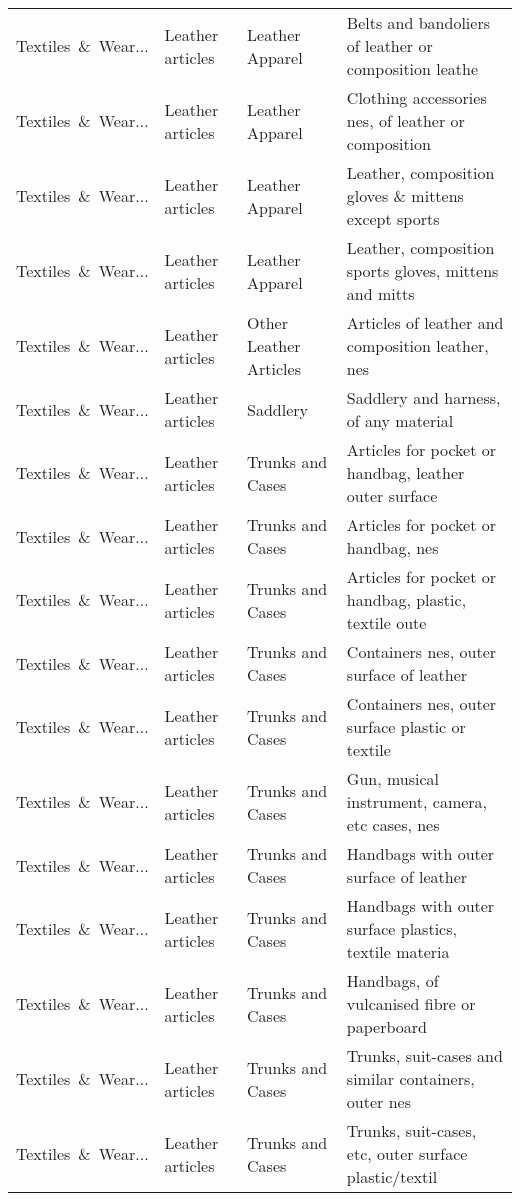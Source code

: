 \begin{appendices}
\begin{xltabular}{\textwidth}{|p{0.10\textwidth}|p{0.25\textwidth}|p{0.24\textwidth}|p{0.31\textwidth}|}
Textiles\ \&\ Wear... & Leather articles & Leather Apparel & Belts and bandoliers of leather or composition leathe \\
Textiles\ \&\ Wear... & Leather articles & Leather Apparel & Clothing accessories nes, of leather or composition \\
Textiles\ \&\ Wear... & Leather articles & Leather Apparel & Leather, composition gloves \& mittens except sports \\
Textiles\ \&\ Wear... & Leather articles & Leather Apparel & Leather, composition sports gloves, mittens and mitts \\
Textiles\ \&\ Wear... & Leather articles & Other Leather Articles & Articles of leather and composition leather, nes \\
Textiles\ \&\ Wear... & Leather articles & Saddlery & Saddlery and harness, of any material \\
Textiles\ \&\ Wear... & Leather articles & Trunks and Cases & Articles for pocket or handbag, leather outer surface \\
Textiles\ \&\ Wear... & Leather articles & Trunks and Cases & Articles for pocket or handbag, nes \\
Textiles\ \&\ Wear... & Leather articles & Trunks and Cases & Articles for pocket or handbag, plastic, textile oute \\
Textiles\ \&\ Wear... & Leather articles & Trunks and Cases & Containers nes, outer surface of leather \\
Textiles\ \&\ Wear... & Leather articles & Trunks and Cases & Containers nes, outer surface plastic or textile \\
Textiles\ \&\ Wear... & Leather articles & Trunks and Cases & Gun, musical instrument, camera, etc cases, nes \\
Textiles\ \&\ Wear... & Leather articles & Trunks and Cases & Handbags with outer surface of leather \\
Textiles\ \&\ Wear... & Leather articles & Trunks and Cases & Handbags with outer surface plastics, textile materia \\
Textiles\ \&\ Wear... & Leather articles & Trunks and Cases & Handbags, of vulcanised fibre or paperboard \\
Textiles\ \&\ Wear... & Leather articles & Trunks and Cases & Trunks, suit-cases and similar containers, outer nes \\
Textiles\ \&\ Wear... & Leather articles & Trunks and Cases & Trunks, suit-cases, etc, outer surface plastic/textil \\

\end{xltabular}
\end{appendices}
